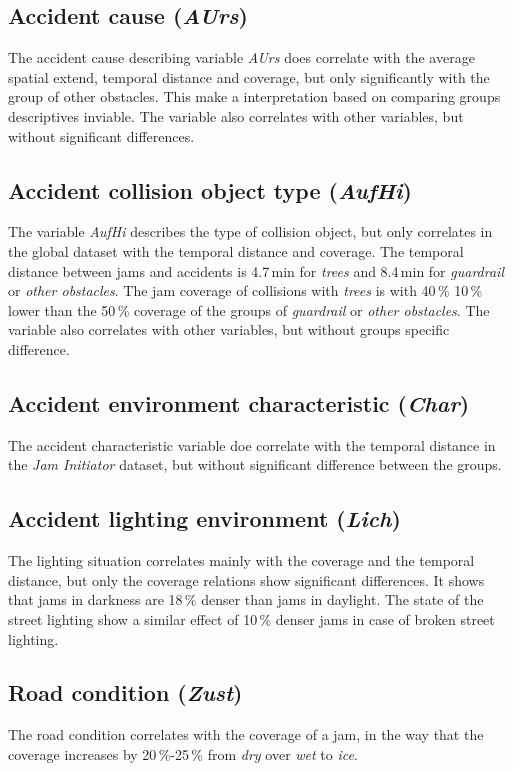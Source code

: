 \subsection{Accident cause (\textit{AUrs})}
\label{analysis_sum_AUrs}
The accident cause describing variable \textit{AUrs} does correlate with the average spatial extend, temporal distance and coverage, but only significantly with the group of other obstacles. This make a interpretation based on comparing groups descriptives inviable. The variable also correlates with other variables, but without significant differences.

\subsection{Accident collision object type (\textit{AufHi})}
\label{analysis_sum_AufHi}
The variable \textit{AufHi} describes the type of collision object, but only correlates in the global dataset with the temporal distance and coverage. The temporal distance between jams and accidents is 4.7\,min for \textit{trees} and 8.4\,min for \textit{guardrail} or \textit{other obstacles}. The jam coverage of collisions with \textit{trees} is with 40\,\% 10\,\% lower than the 50\,\% coverage of the groups of \textit{guardrail} or \textit{other obstacles}. The variable also correlates with other variables, but without groups specific difference.

\subsection{Accident environment characteristic (\textit{Char})}
\label{analysis_sum_Char}
The accident characteristic variable doe correlate with the temporal distance in the \textit{Jam Initiator} dataset, but without significant difference between the groups.

\subsection{Accident lighting environment (\textit{Lich})}
\label{analysis_sum_Lich}
The lighting situation correlates mainly with the coverage and the temporal distance, but only the coverage relations show significant differences. It shows that jams in darkness are 18\,\% denser than jams in daylight. The state of the street lighting show a similar effect of 10\,\% denser jams in case of broken street lighting.

\subsection{Road condition (\textit{Zust})}
\label{analysis_sum_Zust}
The road condition correlates with the coverage of a jam, in the way that the coverage increases by 20\,\%-25\,\% from \textit{dry} over \textit{wet} to \textit{ice}.

